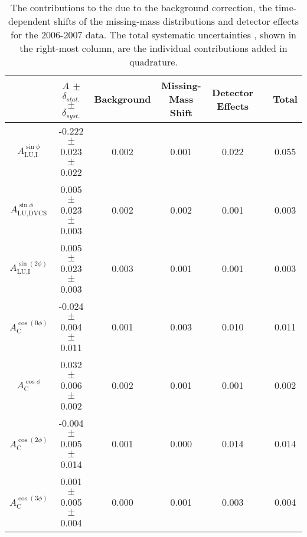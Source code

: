 \begin{table}
 \begin{center}
\resizebox{\textwidth}{!} {
 \begin{tabular}{|c|c|c|c|c|c|c|}
  \hline
 & $A$ $\pm$ $\delta_{stat.}$ $\pm$ $\delta_{syst.}$ & Background & Missing-Mass Shift  & Detector Effects & & Total \\
  \hline
  \hline
  $A_{\textrm{LU,I}}^{\sin\phi}$ & -0.222  $\pm$  0.023  $\pm$   0.022 & 0.002 & 0.001 & 0.022 & & 0.055 \\
  \hline
  $A_{\textrm{LU,DVCS}}^{\sin\phi}$ & 0.005  $\pm$  0.023  $\pm$  0.003 & 0.002 & 0.002 & 0.001 & & 0.003 \\
  \hline
  $A_{\textrm{LU,I}}^{\sin(2\phi)}$ & 0.005  $\pm$  0.023  $\pm$   0.003 & 0.003 & 0.001 & 0.001 & & 0.003 \\
  \hline
  \hline
  $A_{\textrm{C}}^{\cos(0\phi)}$ & -0.024 $\pm$  0.004 $\pm$  0.011 & 0.001 & 0.003 & 0.010 & & 0.011 \\
  \hline
  $A_{\textrm{C}}^{\cos\phi}$ & 0.032  $\pm$  0.006 $\pm$   0.002 & 0.002 & 0.001 & 0.001 & & 0.002 \\
  \hline
  $A_{\textrm{C}}^{\cos(2\phi)}$ & -0.004  $\pm$  0.005  $\pm$   0.014 & 0.001 & 0.000 & 0.014 & & 0.014 \\
  \hline
  $A_{\textrm{C}}^{\cos(3\phi)}$ & 0.001  $\pm$   0.005   $\pm$   0.004 & 0.000 & 0.001 & 0.003 & & 0.004 \\
  \hline
 \end{tabular}
}
  \caption{The contributions to the  due to the
background correction, the time-dependent shifts of the missing-mass
distributions and detector effects for the 2006-2007 data. The total
systematic uncertainties , shown in the
right-most column, are the individual contributions added in quadrature.}
  \label{table_systematic_contributions_0607}
\end{center}
\end{table}

